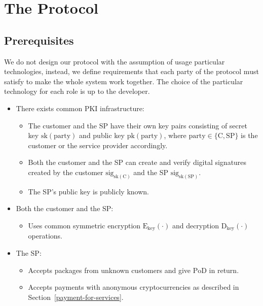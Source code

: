 \documentclass{ieeeaccess}
\begin{document}
\section{The Protocol}\label{sec:protocol}

\subsection{Prerequisites}
We do not design our protocol with the assumption of usage particular technologies, instead, we define requirements that each party of the protocol must satisfy to make the whole system work together. The choice of the particular technology for each role is up to the developer.

\begin{itemize}
\item There exists common PKI infrastructure:
    \begin{itemize}
        \item The customer and the SP have their own key pairs consisting of secret key $\mathrm{sk}(\mathrm{party})$ and public key $\mathrm{pk}(\mathrm{party})$, where $\mathrm{party} \in \{\mathrm{C}, \mathrm{SP}\}$ is the customer or the service provider accordingly.
        \item Both the customer and the SP can create and verify digital signatures created by the customer $\mathrm{sig}_{\mathrm{sk}(\mathrm{C})}$ and the SP $\mathrm{sig}_{\mathrm{sk}(\mathrm{SP})}$.
        \item The SP's public key is publicly known.
    \end{itemize}
    
\item Both the customer and the SP:
    \begin{itemize}
        \item Uses common symmetric encryption $\mathrm{E}_\mathrm{key}(\cdot)$ and decryption $\mathrm{D}_\mathrm{key}(\cdot)$ operations.
    \end{itemize}

\item The SP:
    \begin{itemize}
        \item Accepts packages from unknown customers and give $\mathrm{PoD}$ in return.
        \item Accepts payments with anonymous cryptocurrencies as described in Section~\ref{payment-for-services}.
    \end{itemize}
    

\end{itemize}
\end{document}
